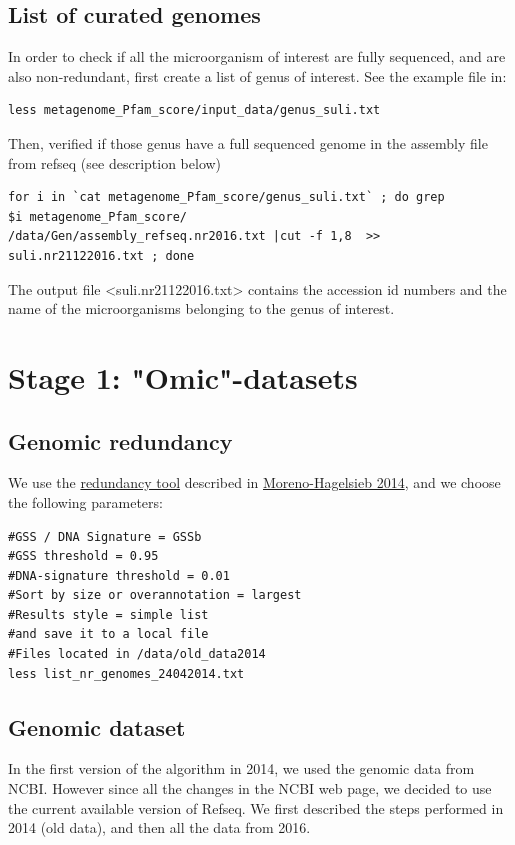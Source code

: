 \documentclass[12pt]{report}
\begin{document}
\subsection{List of curated genomes}

In order to check if all the  microorganism of interest are fully sequenced,
and are also non-redundant, first create a list of genus of interest. See the
example file in: 
\begin{verbatim}
less metagenome_Pfam_score/input_data/genus_suli.txt
\end{verbatim}

Then, verified if those genus have a full  sequenced genome in the 
assembly file from refseq (see description below)
\begin{verbatim}
for i in `cat metagenome_Pfam_score/genus_suli.txt` ; do grep 
$i metagenome_Pfam_score/
/data/Gen/assembly_refseq.nr2016.txt |cut -f 1,8  >> suli.nr21122016.txt ; done
\end{verbatim}

The output file <suli.nr21122016.txt> contains the accession id numbers and the
name of the microorganisms belonging to the genus of interest. 

\section{Stage 1: "Omic"-datasets}
\label{stage1}


\subsection{Genomic redundancy}
We use the
\href{http://microbiome.wlu.ca/research/redundancy/redundancy.cgi}{redundancy
tool}  described in
\href{http://bioinformatics.oxfordjournals.org/content/early/2013/02/27/bioinformatics.btt064.full}{Moreno-Hagelsieb
2014}, and we choose the following parameters:
\begin{verbatim}
#GSS / DNA Signature = GSSb
#GSS threshold = 0.95
#DNA-signature threshold = 0.01
#Sort by size or overannotation = largest
#Results style = simple list
#and save it to a local file 
#Files located in /data/old_data2014
less list_nr_genomes_24042014.txt  
\end{verbatim}

\subsection{Genomic dataset}
In the first version of the algorithm in 2014, we used the genomic data from
NCBI. However since all the changes in the NCBI web page, we decided to use the
current available version of Refseq. We first described the steps performed in
2014 (old data), and then all the data from 2016.
\end{document}

